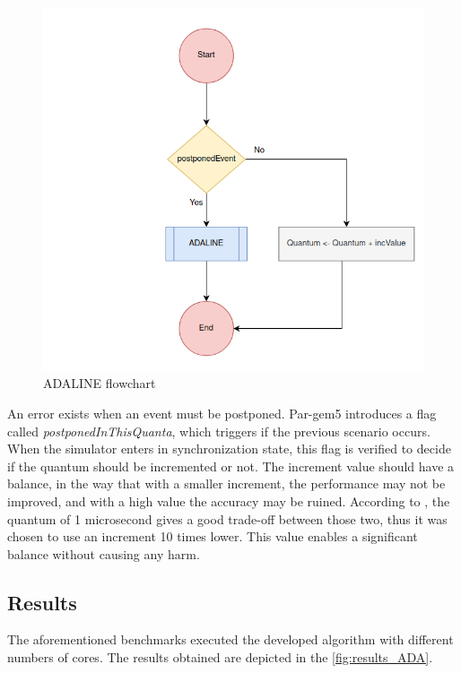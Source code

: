 \begin{figure}[h!]
	\centering
 	\includegraphics[width=0.5\linewidth]{Images/ADALINE_v1.png}
 	\caption{ADALINE flowchart}
	 \label{fig_ADALINE_v1}
\end{figure}

An error exists when an event must be postponed. Par-gem5 \cite{pargem5} introduces a flag called \textit{postponedInThisQuanta}, which triggers 
if the previous scenario occurs. When the simulator enters in synchronization state, this flag is verified to decide if the quantum should be 
incremented or not. The increment value should have a balance, in the way that with a smaller increment, the performance may not be improved, and 
with a high value the accuracy may be ruined. According to \cite{pargem5}, the quantum of 1 microsecond gives a good trade-off between those 
two, thus it was chosen to use an increment 10 times lower. This value enables a significant balance without causing any harm.

\subsection{Results}

The aforementioned benchmarks executed the developed algorithm with different numbers of cores. The results obtained are depicted in the 
\autoref{fig:results_ADA}. 

